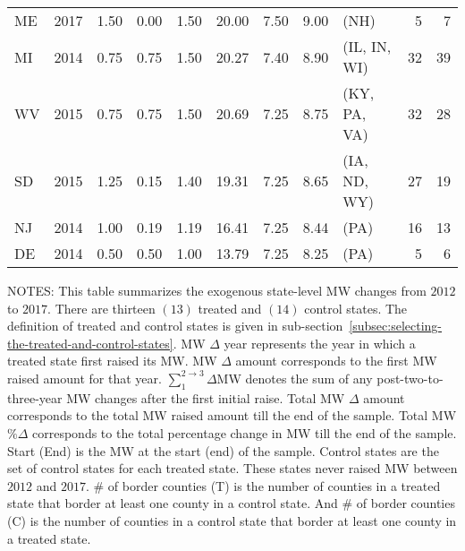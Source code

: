 \begin{table}[H]
{\begin{tabular}{lrrrrrrrlrr}
            ME             & 2017             & 1.50               & 0.00                                 & 1.50                     & 20.00               & 7.50     & 9.00   & (NH)           & 5                         & 7                         \\
            MI             & 2014             & 0.75               & 0.75                                 & 1.50                     & 20.27               & 7.40     & 8.90   & (IL, IN, WI)   & 32                        & 39                        \\
            WV             & 2015             & 0.75               & 0.75                                 & 1.50                     & 20.69               & 7.25     & 8.75   & (KY, PA, VA)   & 32                        & 28                        \\
            SD             & 2015             & 1.25               & 0.15                                 & 1.40                     & 19.31               & 7.25     & 8.65   & (IA, ND, WY)   & 27                        & 19                        \\
            NJ             & 2014             & 1.00               & 0.19                                 & 1.19                     & 16.41               & 7.25     & 8.44   & (PA)           & 16                        & 13                        \\
            DE             & 2014             & 0.50               & 0.50                                 & 1.00                     & 13.79               & 7.25     & 8.25   & (PA)           & 5                         & 6                         \\\bottomrule\bottomrule
        \end{tabular}
    }
    \begin{minipage}{\columnwidth}
        \vspace{0.01in}
        \tiny NOTES: This table summarizes the exogenous state-level MW changes from $2012$ to $2017$. There are thirteen $(13)$ treated and $(14)$ control states. The definition of treated and control states is given in sub-section~\ref{subsec:selecting-the-treated-and-control-states}. MW $\Delta$ year represents the year in which a treated state first raised its MW. MW $\Delta$ amount corresponds to the first MW raised amount for that year. $\sum_{1}^{2 \rightarrow 3}\Delta$MW denotes the sum of any post-two-to-three-year MW changes after the first initial raise. Total MW $\Delta$ amount corresponds to the total MW raised amount till the end of the sample. Total MW $\%\Delta$ corresponds to the total percentage change in MW till the end of the sample. Start (End) is the MW at the start (end) of the sample. Control states are the set of control states for each treated state. These states never raised MW between $2012$ and $2017$. \# of border counties (T) is the number of counties in a treated state that border at least one county in a control state. And \# of border counties (C) is the number of counties in a control state that border at least one county in a treated state.
    \end{minipage}
\end{table}